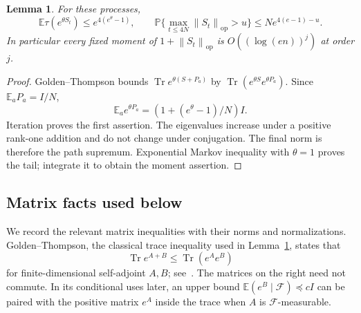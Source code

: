 \documentclass[11pt]{article}
\newtheorem{lemma}[theorem]{Lemma}
\theoremstyle{definition}\newtheorem{definition}[theorem]{Definition}
\theoremstyle{remark}\newtheorem{remark}[theorem]{Remark}
\DeclareMathOperator{\Tr}{Tr}
\newcommand{\E}{\mathbb E}
\newcommand{\PP}{\mathbb P}
\newcommand{\op}{\mathrm{op}}
\newcommand{\norm}[1]{\left\lVert#1\right\rVert}
\begin{document}
\begin{lemma}\label{lem:norm-tail}
For these processes,
\begin{equation}\label{eq:exp-tail}
 \E\tau(e^{\theta S_t})\le e^{4(e^\theta-1)},\qquad
 \PP\{\max_{t\le4N}\norm{S_t}_{\op}>u\}\le Ne^{4(e-1)-u}.
\end{equation}
In particular every fixed moment of $1+\norm{S_t}_{\op}$ is $O((\log(en))^j)$ at order $j$.
\end{lemma}
\begin{proof}
Golden--Thompson bounds $\Tr e^{\theta(S+P_a)}$ by $\Tr(e^{\theta S}e^{\theta P_a})$. Since $\E_a P_a=I/N$,
\[
 \E_a e^{\theta P_a}=(1+(e^\theta-1)/N)I.
\]
Iteration proves the first assertion. The eigenvalues increase under a positive rank-one addition and do not change under conjugation. The final norm is therefore the path supremum. Exponential Markov inequality with $\theta=1$ proves the tail; integrate it to obtain the moment assertion.
\end{proof}


\subsection{Matrix facts used below}
We record the relevant matrix inequalities with their norms and normalizations. Golden--Thompson, the classical trace inequality used in Lemma~\ref{lem:norm-tail}, states that
\[
 \Tr e^{A+B}\le\Tr(e^Ae^B)
\]
for finite-dimensional self-adjoint $A,B$; see~\cite{Golden,Thompson}. The matrices on the right need not commute. In its conditional uses later, an upper bound $\E(e^B\mid\mathcal F)\preceq cI$ can be paired with the positive matrix $e^A$ inside the trace when $A$ is $\mathcal F$-measurable.
\end{document}
